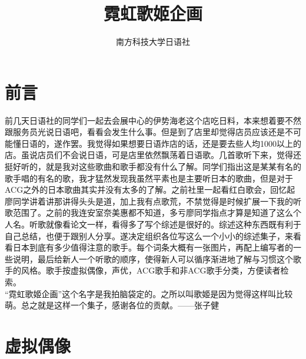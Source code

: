 \documentclass{ctexart}
\title{霓虹歌姬企画}
\author{南方科技大学日语社}
\begin{document}
\maketitle
\tableofcontents

\section{前言}
前几天日语社的同学们一起去会展中心的伊势海老这个店吃日料，本来想着要不然跟服务员光说日语吧，看看会发生什么事。但是到了店里却觉得店员应该还是不可能懂日语的，遂作罢。我觉得如果想要日语炸店的话，还是要去些人均1000以上的店。虽说店员们不会说日语，可是店里依然飘荡着日语歌。几首歌听下来，觉得还挺好听的，就是我对这些歌曲和歌手都没有什么了解。同学们指出这是某某有名的歌手唱的有名的歌，我才猛然发现我虽然平素也是主要听日本的歌曲，但是对于ACG之外的日本歌曲其实并没有太多的了解。之前社里一起看红白歌会，回忆起廖同学讲着讲那讲得头头是道，加上我有点歌荒，不禁觉得是时候扩展一下我的听歌范围了。之前的我连安室奈美惠都不知道，多亏廖同学指点才算是知道了这么个人名。听歌就像看论文一样，看得多了写个综述是很好的。综述这种东西既有利于自己总结，也便于跟别人分享。遂决定组织各位写这么一个小小的综述集子，来看看日本到底有多少值得注意的歌手。每个词条大概有一张图片，再配上编写者的一些说明，最后给新人一个听歌的顺序，使得新人可以循序渐进地了解与习惯这个歌手的风格。歌手按虚拟偶像，声优，ACG歌手和非ACG歌手分类，方便读者检索。\\
“霓虹歌姬企画”这个名字是我拍脑袋定的。之所以叫歌姬是因为觉得这样叫比较萌。总之就是这样一个集子，感谢各位的贡献。——张子健


\section{虚拟偶像}
\end{document}
